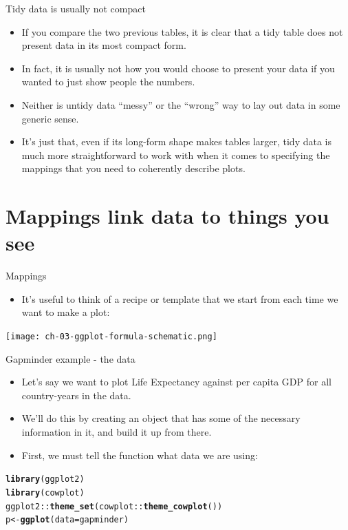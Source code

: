 \documentclass[10pt]{beamer}\usepackage[]{graphicx}\usepackage[]{color}
\makeatletter
\newcommand{\hlopt}[1]{\textcolor[rgb]{0,0,0}{#1}}%
\newcommand{\hlstd}[1]{\textcolor[rgb]{0.345,0.345,0.345}{#1}}%
\newcommand{\hlkwb}[1]{\textcolor[rgb]{0.69,0.353,0.396}{#1}}%
\newcommand{\hlkwc}[1]{\textcolor[rgb]{0.333,0.667,0.333}{#1}}%
\newcommand{\hlkwd}[1]{\textcolor[rgb]{0.737,0.353,0.396}{\textbf{#1}}}%
\newenvironment{kframe}{%
 \def\at@end@of@kframe{}%
 \ifinner\ifhmode%
  \def\at@end@of@kframe{\end{minipage}}%
  \begin{minipage}{\columnwidth}%
 \fi\fi%
 \def\FrameCommand##1{\hskip\@totalleftmargin \hskip-\fboxsep
 \colorbox{shadecolor}{##1}\hskip-\fboxsep
     \hskip-\linewidth \hskip-\@totalleftmargin \hskip\columnwidth}%
 \MakeFramed {\advance\hsize-\width
   \@totalleftmargin\z@ \linewidth\hsize
   \@setminipage}}%
 {\par\unskip\endMakeFramed%
 \at@end@of@kframe}
\newenvironment{knitrout}{}{} %
\makeatother
\begin{document}
\begin{frame}{Tidy data is usually not compact}
	\begin{itemize}
		\item If you compare the two previous tables, it is clear that a tidy table does not present data in its most compact form. \item In fact, it is usually not how you would choose to present your data if you wanted to just show people the numbers. \item Neither is untidy data “messy” or the “wrong” way to lay out data in some generic sense. 
		\item It's just that, even if its long-form shape makes tables larger, tidy data is much more straightforward to work with when it comes to specifying the mappings that you need to coherently describe plots.
	\end{itemize}
\end{frame}


\section{Mappings link data to things you see}

\begin{frame}{Mappings}
	\begin{itemize}
		\item It’s useful to think of a recipe or template that we start from each time we want to make a plot:
	\end{itemize}
\vspace*{0.5in}
\centering
\texttt{[image: ch-03-ggplot-formula-schematic.png]}
\end{frame}



\begin{frame}[fragile]{Gapminder example - the data}
	
	\begin{itemize}
		\item Let’s say we want to plot Life Expectancy against per capita GDP for all country-years in the data. 
		\item  We’ll do this by creating an object that has some of the necessary information in it, and build it up from there. \item First, we must tell the  function what data we are using:
	\end{itemize}
	
\begin{knitrout}
\color{fgcolor}\begin{kframe}
\begin{alltt}
\hlkwd{library}\hlstd{(ggplot2)}
\hlkwd{library}\hlstd{(cowplot)}
\hlstd{ggplot2}\hlopt{::}\hlkwd{theme_set}\hlstd{(cowplot}\hlopt{::}\hlkwd{theme_cowplot}\hlstd{())}
\hlstd{p} \hlkwb{<-} \hlkwd{ggplot}\hlstd{(}\hlkwc{data} \hlstd{= gapminder)}
\end{alltt}
\end{kframe}
\end{knitrout}
	
\end{frame}
\end{document}
